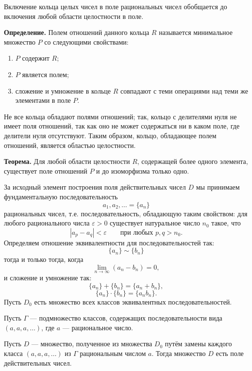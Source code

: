 \begin{rusblock}
Включение кольца целых чисел в поле рациональных чисел обобщается до включения любой области целостности в поле.

\textbf{Определение.} Полем отношений данного кольца $R$ называется минимальное множество $P$ со следующими свойствами:
\begin{enumerate}[leftmargin=2.2em]
\item $P$ содержит $R$;
\item $P$ является полем;
\item сложение и умножение в кольце $R$ совпадают с теми операциями над теми же элементами в поле $P$.
\end{enumerate}
Не все кольца обладают полями отношений; так, кольцо с делителями нуля не имеет поля отношений, так как оно не может содержаться ни в каком поле, где делители нуля отсутствуют. Таким образом, кольцо, обладающее полем отношений, является областью целостности.

\textbf{Теорема.} Для любой области целостности $R$, содержащей более одного элемента, существует поле отношений $P$ и до изоморфизма только одно.
\end{rusblock}

\begin{rusblock}
За исходный элемент построения поля действительных чисел $D$ мы принимаем фундаментальную последовательность
\[
a_1,a_2,\ldots=\{a_n\}
\]
рациональных чисел, т.е. последовательность, обладающую таким свойством: для любого рационального числа $\varepsilon>0$ существует натуральное число $n_0$ такое, что
\[
|a_p-a_q|<\varepsilon\qquad\text{при любых }p,q>n_0.
\]
Определяем отношение эквивалентности для последовательностей так:
\[
\{a_n\}\sim\{b_n\}
\]
тогда и только тогда, когда
\[
\lim_{n\to\infty}(a_n-b_n)=0,
\]
и сложение и умножение так:
\[
\{a_n\}+\{b_n\}=\{a_n+b_n\},
\]
\[
\{a_n\}\cdot\{b_n\}=\{a_nb_n\}.
\]
Пусть $D_0$ есть множество всех классов эквивалентных последовательностей.

Пусть $\Gamma$ --- подмножество классов, содержащих последовательности вида $(a,a,a,\ldots)$, где $a$ --- рациональное число.

Пусть $D$ --- множество, полученное из множества $D_0$ путём замены каждого класса $(a,a,a,\ldots)$ из $\Gamma$ рациональным числом $a$. Тогда множество $D$ есть поле действительных чисел.
\end{rusblock}

